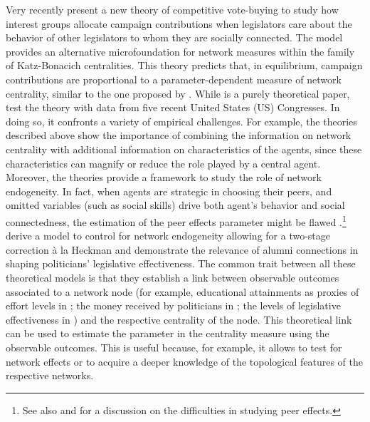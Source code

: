 \documentclass[nojss]{jss}
\begin{document}
Very recently \cite{Battaglini+Patacchini:2018} present a new theory of
competitive vote-buying to study how interest groups allocate campaign
contributions when legislators care about the behavior of other legislators
to whom they are socially connected.  The model provides an alternative
microfoundation for network measures within the family of Katz-Bonacich
centralities.  This theory predicts that, in equilibrium, campaign
contributions are proportional to a parameter-dependent measure of network
centrality, similar to the one proposed by
\cite{Ballester+Armengol+Zenou:2006}.  While
\cite{Ballester+Armengol+Zenou:2006} is a purely theoretical paper,
\cite{Battaglini+Patacchini:2018} test the theory with data from five recent
United States (US) Congresses.  In doing so, it confronts a variety of empirical
challenges.  For example, the theories described above show the importance
of combining the information on network centrality with additional
information on characteristics of the agents, since these characteristics
can magnify or reduce the role played by a central agent.  Moreover, the
theories provide a framework to study the role of network endogeneity.  In
fact, when agents are strategic in choosing their peers, and omitted
variables (such as social skills) drive both agent's behavior and social
connectedness, the estimation of the peer effects parameter might be flawed
\citep{Manski:1993}.\footnote{See also \cite{An:2015a} and
\cite{VanderWeele+An:2013} for a discussion on the difficulties in studying
peer effects.} \cite{Battaglini+Sciabolazza+Patacchini:2020} derive a model
to control for network endogeneity allowing for a two-stage correction \`{a}
la Heckman \citep{Heckman:1979} and demonstrate the relevance of alumni
connections in shaping politicians' legislative effectiveness.  The common
trait between all these theoretical models is that they establish a link
between observable outcomes associated to a network node (for example,
educational attainments as proxies of effort levels in
\cite{Ballester+Armengol+Zenou:2006}; the money received by politicians in
\cite{Battaglini+Patacchini:2018}; the levels of legislative effectiveness
in \cite{Battaglini+Sciabolazza+Patacchini:2020}) and the respective
centrality of the node.  This theoretical link can be used to estimate the
parameter in the centrality measure using the observable outcomes.  This is
useful because, for example, it allows to test for network effects or to
acquire a deeper knowledge of the topological features of the respective
networks.
\end{document}
